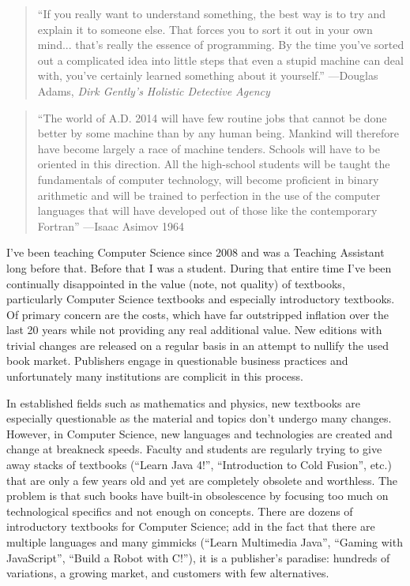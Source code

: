
\begin{quote}
``If you really want to understand something, the best way is to try and explain it to someone else. That forces you to sort it out in your own mind... that's really the essence of programming. By the time you've sorted out a complicated idea into little steps that even a stupid machine can deal with, you've certainly learned something about it yourself.'' ---Douglas Adams, \emph{Dirk Gently's Holistic Detective Agency} \cite{Adams1987}
\end{quote}

\begin{quote}
``The world of A.D. 2014 will have few routine jobs that cannot be done better by some machine than by any human being. Mankind will therefore have become largely a race of machine tenders. Schools will have to be oriented in this direction. All the high-school students will be taught the fundamentals of computer technology, will become proficient in binary arithmetic and will be trained to perfection in the use of the computer languages that will have developed out of those like the contemporary Fortran''
---Isaac Asimov 1964
\end{quote}

I've been teaching Computer Science since 2008 and was a Teaching Assistant long before that.  Before that
I was a student.  During that entire time I've been continually disappointed in the value (note, not quality) of
textbooks, particularly Computer Science textbooks and especially introductory textbooks.  Of primary concern
are the costs, which have far outstripped inflation over the last 20 years while not providing any 
real additional value.  New editions with trivial changes are released on a regular basis in an attempt to
nullify the used book market.  Publishers engage in questionable business practices and unfortunately many
institutions are complicit in this process.

In established fields such as mathematics and physics, new textbooks are especially questionable as the
material and topics don't undergo many changes.  However, in Computer Science, new languages and
technologies are created and change at breakneck speeds.  Faculty and students are regularly trying to
give away stacks of textbooks (``Learn Java 4!'', ``Introduction to Cold Fusion'', etc.) that are only a few
years old and yet are completely obsolete and worthless.  The problem is that such books have built-in
obsolescence by focusing too much on technological specifics and not enough on concepts.  There are
dozens of introductory textbooks for Computer Science; add in the fact that there are multiple languages
and many gimmicks (``Learn Multimedia Java'', ``Gaming with JavaScript'', ``Build a Robot with C!''), it is a 
publisher's paradise: hundreds of variations, a growing market, and customers with few alternatives.

